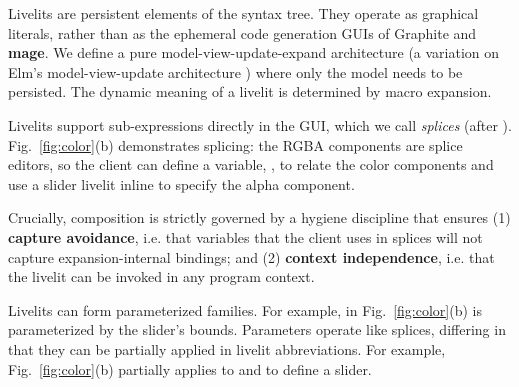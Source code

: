   Livelits are persistent elements of the syntax tree. They operate as  
  graphical literals, rather than as the ephemeral code generation GUIs of Graphite and \textbf{mage}. 
  We define a pure model-view-update-expand architecture
  (a variation on Elm's model-view-update architecture \cite{ElmArchitecture}) 
  where only the model needs to be persisted.
  The dynamic meaning of a livelit is determined by macro expansion.

%
  Livelits support sub-expressions directly in the GUI, which we call \emph{splices} (after
   \citet{TLMs}).
  Fig.~\ref{fig:color}(b) demonstrates splicing: the RGBA components  
  are splice editors, so the client can define a variable, ,
  to relate the color components 
  and use a slider livelit inline to specify the alpha component.
  
  Crucially, composition is strictly 
  governed by a hygiene discipline that ensures
  (1) \textbf{capture avoidance}, i.e. that variables that the client uses in splices 
  will not capture expansion-internal bindings; and 
  (2) \textbf{context independence}, i.e. that the livelit 
  can be invoked in any program context.%

 Livelits can form parameterized families.
  For example,  in Fig.~\ref{fig:color}(b) is parameterized by the slider's bounds.
  Parameters operate like splices, differing in that they can be partially applied in
  livelit abbreviations. For example, Fig.~\ref{fig:color}(b) 
  partially applies  to  and  to define a  slider.

